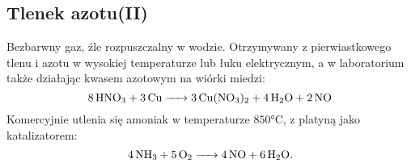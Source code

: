 \subsection{Tlenek azotu(II) }
Bezbarwny gaz, źle rozpuszczalny w wodzie.
Otrzymywany z pierwiastkowego tlenu i azotu w wysokiej temperaturze lub łuku elektrycznym, a w laboratorium także działając kwasem azotowym na wiórki miedzi:
$$\ce{8 HNO3 + 3 Cu -> 3 Cu(NO3)2 + 4 H2O + 2 NO}$$
Komercyjnie utlenia się amoniak w temperaturze $850\si{\celsius}$, z platyną jako katalizatorem:
$$\ce{4 NH3 + 5 O2 -> 4 NO + 6 H2O}.$$







